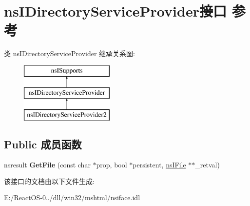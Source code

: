\hypertarget{interfacens_i_directory_service_provider}{}\section{ns\+I\+Directory\+Service\+Provider接口 参考}
\label{interfacens_i_directory_service_provider}
类 ns\+I\+Directory\+Service\+Provider 继承关系图\+:\begin{figure}[H]
\begin{center}
\leavevmode
\includegraphics[height=3.000000cm]{interfacens_i_directory_service_provider}
\end{center}
\end{figure}
\subsection*{Public 成员函数}
\begin{DoxyCompactItemize}
\item 
\mbox{\label{interfacens_i_directory_service_provider_a4da04ddaccdc4bc52bb387f9422b333b}} 
nsresult {\bfseries Get\+File} (const char $\ast$prop, bool $\ast$persistent, \hyperlink{interfacens_i_file}{ns\+I\+File} $\ast$$\ast$\+\_\+retval)
\end{DoxyCompactItemize}


该接口的文档由以下文件生成\+:\begin{DoxyCompactItemize}
\item 
E\+:/\+React\+O\+S-\/0../dll/win32/mshtml/nsiface.\+idl\end{DoxyCompactItemize}

